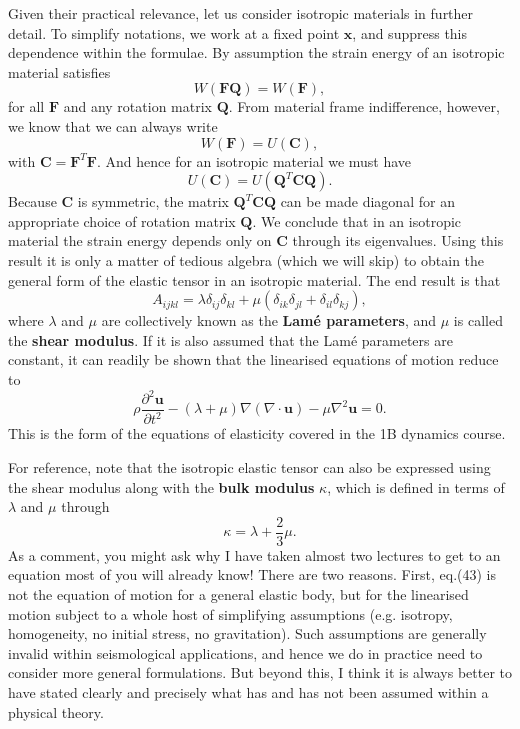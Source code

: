 \documentclass [a4paper,12pt]{paper}
\begin{document}
Given their practical relevance, let us consider isotropic materials in further detail. To simplify notations, 
we work at a fixed point $\mathbf{x}$, and suppress this dependence within the formulae. By assumption the strain energy of an 
isotropic material satisfies
\begin{equation}
W(\mathbf{F}\mathbf{Q}) = W(\mathbf{F}),
\end{equation}
for all $\mathbf{F}$ and any rotation matrix $\mathbf{Q}$. From material frame indifference, however, we know that we can always write
\begin{equation}
W(\mathbf{F}) = U(\mathbf{C}),
\end{equation}
with $\mathbf{C} = \mathbf{F}^{T}\mathbf{F}$. And hence for an isotropic material we must have
\begin{equation}
U(\mathbf{C}) = U(\mathbf{Q}^{T}\mathbf{C}\mathbf{Q}).
\end{equation}
Because $\mathbf{C}$ is symmetric, the matrix $\mathbf{Q}^{T}\mathbf{C}\mathbf{Q}$ can be made diagonal for
 an appropriate choice of rotation matrix $\mathbf{Q}$. We conclude that in an isotropic material the strain 
 energy depends only on $\mathbf{C}$ through its eigenvalues. Using this result it is only a matter of tedious algebra 
 (which we will skip) to obtain the general form of the elastic tensor in an isotropic material. The end result is that
\begin{equation}
A_{ijkl} = \lambda\delta_{ij}\delta_{kl} + \mu(\delta_{ik}\delta_{jl} + \delta_{il}\delta_{kj}),
\end{equation}
where $\lambda$ and $\mu$ are collectively known as the \textbf{Lamé parameters}, and $\mu$ is 
called the \textbf{shear modulus}. If it is also assumed that the Lamé parameters are constant, it can readily be shown that
 the linearised equations of motion reduce to
\begin{equation}
\rho\frac{\partial^2 \mathbf{u}}{\partial t^2} - (\lambda + \mu)\nabla(\nabla\cdot \mathbf{u}) - \mu\nabla^2 \mathbf{u} = 0.
\end{equation}
This is the form of the equations of elasticity covered in the 1B dynamics course. 

For reference, note that the isotropic elastic tensor can also be expressed using the shear modulus along with the \textbf{bulk modulus}
 $\kappa$, which is defined in terms of $\lambda$ and $\mu$ through
\begin{equation}
\kappa = \lambda + \frac{2}{3}\mu.
\end{equation}
As a comment, you might ask why I have taken almost two lectures to get to an equation most of you will already know! There are 
two reasons. First, eq.(43) is not the equation of motion for a general elastic body, but for the linearised motion subject to a 
whole host of simplifying assumptions (e.g. isotropy, homogeneity, no initial stress, no gravitation). Such assumptions are generally 
invalid within seismological applications, and hence we do in practice need to consider more general formulations. But beyond this, I 
think it is always better to have stated clearly and precisely what has and has not been assumed within a physical theory.
\end{document}
